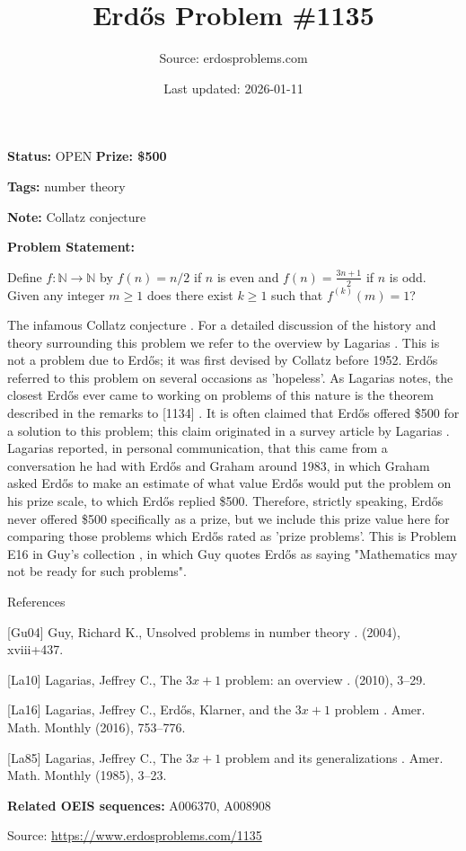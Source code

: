 \documentclass{article}
\title{Erd\H{o}s Problem \#1135}
\date{Last updated: 2026-01-11}
\author{Source: erdosproblems.com}
\begin{document}
\maketitle

\noindent\textbf{Status:} OPEN \quad \textbf{Prize: \$500}

\noindent\textbf{Tags:} number theory

\medskip
\noindent\textbf{Note:} Collatz conjecture

\medskip

\noindent\textbf{Problem Statement:}

Define $f:\mathbb{N}\to \mathbb{N}$ by $f(n)=n/2$ if $n$ is even and $f(n)=\frac{3n+1}{2}$ if $n$ is odd. Given any integer $m\geq 1$ does there exist $k\geq 1$ such that $f^{(k)}(m)=1$?




The infamous Collatz conjecture . For a detailed discussion of the history and theory surrounding this problem we refer to the overview by Lagarias \cite{La10}. This is not a problem due to Erd\H{o}s; it was first devised by Collatz before 1952. Erd\H{o}s referred to this problem on several occasions as 'hopeless'. As Lagarias \cite{La16} notes, the closest Erd\H{o}s ever came to working on problems of this nature is the theorem described in the remarks to [1134] . It is often claimed that Erd\H{o}s offered \$500 for a solution to this problem; this claim originated in a survey article by Lagarias \cite{La85}. Lagarias reported, in personal communication, that this came from a conversation he had with Erd\H{o}s and Graham around 1983, in which Graham asked Erd\H{o}s to make an estimate of what value Erd\H{o}s would put the problem on his prize scale, to which Erd\H{o}s replied \$500. Therefore, strictly speaking, Erd\H{o}s never offered \$500 specifically as a prize, but we include this prize value here for comparing those problems which Erd\H{o}s rated as 'prize problems'. This is Problem E16 in Guy's collection \cite{Gu04}, in which Guy quotes Erd\H{o}s as saying "Mathematics may not be ready for such problems".




References

[Gu04] Guy, Richard K., Unsolved problems in number theory . (2004), xviii+437.

[La10] Lagarias, Jeffrey C., The {$3x+1$} problem: an overview . (2010), 3--29.

[La16] Lagarias, Jeffrey C., Erd\H{o}s, {K}larner, and the {$3x+1$} problem . Amer. Math. Monthly (2016), 753--776.

[La85] Lagarias, Jeffrey C., The {$3x+1$} problem and its generalizations . Amer. Math. Monthly (1985), 3--23.

\noindent\textbf{Related OEIS sequences:} A006370, A008908


\bigskip
\noindent\small{Source: \url{https://www.erdosproblems.com/1135}}
\end{document}
